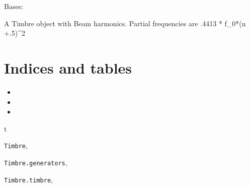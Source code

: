 \documentclass[letterpaper,10pt,english]{sphinxmanual}
\begin{document}
\begin{fulllineitems}
\label{index:Timbre.generators.Beam}
Bases: {\hyperref[index:Timbre.timbre.Timbre]{\emph{}}}

A Timbre object with Beam harmonics. Partial frequencies are .4413 * f\_0*(n +.5)\textasciicircum{}2

\end{fulllineitems}



\chapter{Indices and tables}
\label{index:indices-and-tables}\begin{itemize}
\item {} 

\item {} 

\item {} 

\end{itemize}


\renewcommand{\indexname}{Python Module Index}
\begin{theindex}
\def\bigletter#1{{\Large\sffamily#1}\nopagebreak\vspace{1mm}}
\bigletter{t}
\item {\texttt{Timbre}}, \pageref{index:module-Timbre}
\item {\texttt{Timbre.generators}}, \pageref{index:module-Timbre.generators}
\item {\texttt{Timbre.timbre}}, \pageref{index:module-Timbre.timbre}
\end{theindex}

\renewcommand{\indexname}{Index}
\printindex
\end{document}
